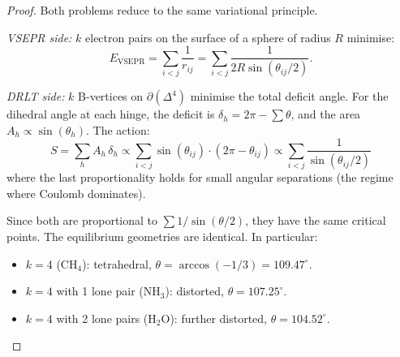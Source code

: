 \begin{proof}
Both problems reduce to the same variational principle.

\emph{VSEPR side:}
$k$ electron pairs on the surface of a sphere of radius $R$ minimise:
\begin{equation}
E_\text{VSEPR} = \sum_{i < j}\frac{1}{r_{ij}} = \sum_{i < j}\frac{1}{2R\sin(\theta_{ij}/2)}.
\end{equation}

\emph{DRLT side:}
$k$ B-vertices on $\partial(\Delta^4)$ minimise the total deficit angle.  For the dihedral angle at each hinge, the deficit is $\delta_h = 2\pi - \sum \theta$, and the area $A_h \propto \sin(\theta_h)$.  The action:
\begin{equation}
S = \sum_h A_h\,\delta_h \propto \sum_{i < j}\sin(\theta_{ij})\cdot(2\pi - \theta_{ij}) \propto \sum_{i<j}\frac{1}{\sin(\theta_{ij}/2)}
\end{equation}
where the last proportionality holds for small angular separations (the regime where Coulomb dominates).

Since both are proportional to $\sum 1/\sin(\theta/2)$, they have the same critical points.  The equilibrium geometries are identical.  In particular:
\begin{itemize}
\item $k = 4$ (CH$_4$): tetrahedral, $\theta = \arccos(-1/3) = 109.47^\circ$.
\item $k = 4$ with 1 lone pair (NH$_3$): distorted, $\theta = 107.25^\circ$.
\item $k = 4$ with 2 lone pairs (H$_2$O): further distorted, $\theta = 104.52^\circ$.
\end{itemize}
\end{proof}

